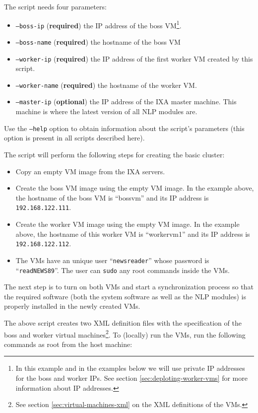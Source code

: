 \documentclass[a4]{article}
\begin{document}
\noindent The script needs four parameters:
\begin{itemize}
\item \texttt{--boss-ip} (\textbf{required}) the IP address of the boss
  VM\footnote{In this example and in the examples below we will use private
    IP addresses for the boss and worker IPs. See section
    \ref{sec:deploting-worker-vms} for more information about IP
    addresses.}.
\item \texttt{--boss-name} (\textbf{required}) the hostname of the boss VM
\item \texttt{--worker-ip} (\textbf{required}) the IP address of the first
  worker VM created by this script.
\item \texttt{--worker-name} (\textbf{required}) the hostname of the worker
  VM.
\item \texttt{--master-ip} (\textbf{optional}) the IP address of the IXA
  master machine. This machine is where the latest version of all NLP
  modules are.
\end{itemize}

Use the \texttt{--help} option to obtain information about the script's
parameters (this option is present in all scripts described here).

The script will perform the following steps for creating the basic cluster:
\begin{itemize}
\item Copy an empty VM image from the IXA servers.
\item Create the boss VM image using the empty VM image. In the example
  above, the hostname of the boss VM is ``\textrm{bossvm}'' and its IP
  address is \texttt{192.168.122.111}.
\item Create the worker VM image using the empty VM image.  In the example
  above, the hostname of this worker VM is ``\textrm{workervm1}'' and its IP
  address is \texttt{192.168.122.112}.
\item The VMs have an unique user ``\texttt{newsreader}'' whose password is
  ``\texttt{readNEWS89}''. The user can \texttt{sudo} any root commands
  inside the VMs.
\end{itemize}

The next step is to turn on both VMs and start a synchronization process so
that the required software (both the system software as well as the NLP
modules) is properly installed in the newly created VMs.

The above script creates two XML definition files with the specification of
the boss and worker virtual machines\footnote{See section \ref{sec:virtual-machines-xml} on the XML
  definitions of the VMs.}. To (locally) run the VMs, run the following
commands as root from the host machine:
\end{document}
